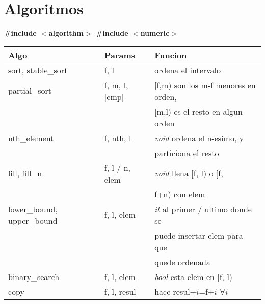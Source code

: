 \documentclass[10pt,landscape,twocolumn,a4paper,notitlepage]{article}
\def\nbtitle#1{\begin{Large}\begin{center}\textbf{#1}\end{center}\end{Large}}
\begin{document}
\tableofcontents %

\section{Algoritmos}
\textbf{\#include $<$algorithm$>$ \#include $<$numeric$>$ \\}
\begin{tabular}{|l|l|l|} \hline
\textbf{Algo} & \textbf{Params} &  \textbf{Funcion} \\  \hline
sort, stable\_sort & f, l &  ordena el intervalo \\  \hline
partial\_sort & f, m, l, [cmp] & [f,m) son los m-f menores en orden, \\ && [m,l) es el resto en algun orden \\ \hline
nth\_element & f, nth, l & \textit{void} ordena el n-esimo, y \\ && particiona el resto \\  \hline
fill, fill\_n & f, l / n, elem & \textit{void} llena [f, l) o [f, \\ && f+n) con elem \\  \hline

lower\_bound, upper\_bound & f, l, elem & \textit{it} al primer / ultimo donde se \\ && puede insertar elem para que\\ && quede ordenada \\  \hline
binary\_search & f, l, elem & \textit{bool} esta elem en [f, l) \\  \hline
copy & f, l, resul & hace resul+$i$=f+$i$ $\forall i$ \\  \hline
\end{tabular}
\end{document}
